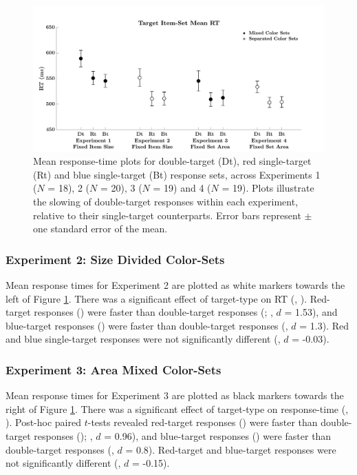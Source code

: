 \begin{figure}[htb]
\centering \includegraphics[width=\linewidth]{Figures/EstSystems/FIG6JPG.jpeg}
\caption{Mean response-time plots for double-target (Dt), red single-target (Rt) and blue single-target (Bt) response sets, across Experiments 1 ($N$ = 18), 2 ($N$ = 20), 3 ($N$ = 19) and 4 ($N$ = 19). Plots illustrate the slowing of double-target responses within each experiment, relative to their single-target counterparts. Error bars represent $\pm$ one standard error of the mean.}
\label{fig:MeanRTAcc}
\end{figure}

\subsubsection{Experiment 2: Size Divided Color-Sets}
Mean response times for Experiment 2 are plotted as white markers towards the left of Figure \ref{fig:MeanRTAcc}. There was a significant effect of target-type on RT (, ). Red-target responses () were faster than double-target responses (; , $d$ = 1.53), and blue-target responses () were faster than double-target responses (, $d$ = 1.3). Red and blue single-target responses were not significantly different (, $d$ = -0.03).

\subsubsection{Experiment 3: Area Mixed Color-Sets}
Mean response times for Experiment 3 are plotted as black markers towards the right of Figure \ref{fig:MeanRTAcc}. There was a significant effect of target-type on response-time (, ). Post-hoc paired $t$-tests revealed red-target responses () were faster than double-target responses (); , $d$ = 0.96), and blue-target responses () were faster than double-target responses (, $d$ = 0.8). Red-target and blue-target responses were not significantly different (, $d$ = -0.15).

